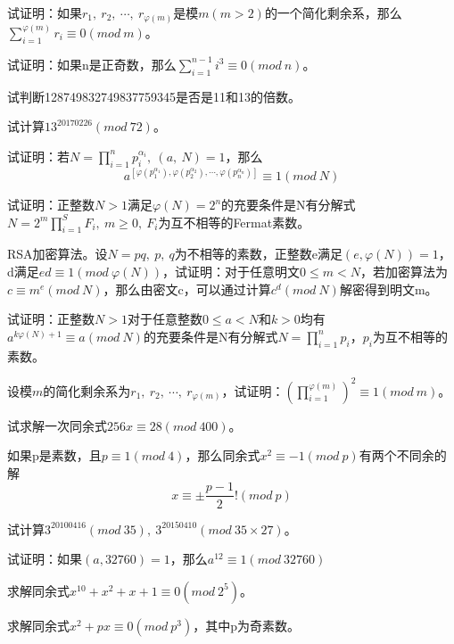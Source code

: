 \documentclass[cn,10pt]{elegantbook}
\begin{document}
\begin{problemset}
  \item 试证明：如果$r_1,\ r_2,\ \cdots ,\ r_{\varphi(m)}$是模$m(m>2)$的一个简化剩余系，那么$\sum_{i=1}^{\varphi(m)}r_i \equiv 0(mod\ m)$。
  \item 试证明：如果n是正奇数，那么$\sum_{i=1}^{n-1}i^3 \equiv 0(mod\ n)$。
  \item 试判断128749832749837759345是否是11和13的倍数。
  \item 试计算$13^{20170226}(mod\ 72)$。
  \item 试证明：若$N = \prod_{i=1}^n p_i^{\alpha_i},\ (a,\ N) = 1$，那么
  \begin{equation*}
    a^{[\varphi(p_1^{\alpha_1}),\varphi(p_2^{\alpha_2}),\cdots,\varphi(p_n^{\alpha_n})]} \equiv 1(mod\ N)
  \end{equation*}
  \item 试证明：正整数$N>1$满足$\varphi(N) =2^n$的充要条件是N有分解式$N=2^m\prod_{i=1}^SF_i,\ m\geq 0,\ F_i$为互不相等的Fermat素数。
  \item RSA加密算法。设$N = pq,\ p,\ q $为不相等的素数，正整数e满足$(e,\varphi(N)) = 1$，d满足$ed \equiv 1(mod\ \varphi(N))$，试证明：对于任意明文$0 \leq m <N$，若加密算法为$c \equiv m^e(mod\ N)$，那么由密文c，可以通过计算$c^d(mod\ N)$解密得到明文m。
  \item 试证明：正整数$N>1$对于任意整数$0 \leq a <N$和$k>0$均有$a^{k\varphi(N)+1} \equiv a(mod\ N)$的充要条件是N有分解式$N = \prod_{i=1}^np_i$，$p_i$为互不相等的素数。
  \item 设模$m$的简化剩余系为$r_1,\ r_2,\ \cdots,\ r_{\varphi(m)}$，试证明：$(\prod_{i=1}^{\varphi(m)})^2 \equiv 1(mod\ m)$。
  \item 试求解一次同余式$256x \equiv 28(mod\ 400)$。
  \item 如果p是素数，且$p \equiv 1(mod\ 4)$，那么同余式$x^2 \equiv -1(mod\ p)$有两个不同余的解
  \begin{equation*}
    x \equiv \pm \frac{p-1}{2}!(mod\ p)
  \end{equation*}
  \item 试计算$3^{20100416}(mod\ 35),\ 3^{20150410}(mod\ 35 \times 27)$。
  \item 试证明：如果$(a,32760) = 1$，那么$a^{12} \equiv 1(mod\ 32760)$
  \item 求解同余式$x^{10}+x^2+x+1 \equiv 0(mod\ 2^5)$。
  \item 求解同余式$x^2+px \equiv 0(mod\ p^3)$，其中p为奇素数。
\end{problemset}
\end{document}
